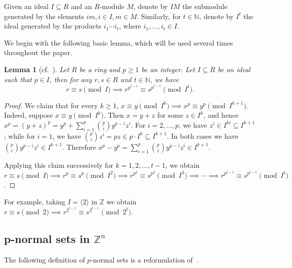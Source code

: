 \documentclass[letterpaper, 11pt, thm-restate]{article}
\numberwithin{equation}{section}
\newcommand{\Z}{\mathbb{Z}}
\newcommand{\N}{\mathbb{N}}
\newcommand{\gen}[1]{\langle {#1} \rangle}
\newtheorem{lemma}[theorem]{Lemma}
\theoremstyle{definition}
\theoremstyle{definition}
\theoremstyle{definition}
\begin{document}
\medskip
Given an ideal $I \subseteq R$ and an $R$-module $M$, denote by $IM$ the submodule generated by the elements $im, i \in I, m \in M$.
Similarly, for $t \in \N$, denote by $I^t$ the ideal generated by the products $i_1 \cdots i_t$, where $i_1, \ldots, i_t \in I$.

We begin with the following basic lemma, which will be used several times throughout the paper.
\begin{lemma}[{cf.~\cite[Lemma~3.13]{dong2025s}}]\label{lem:lifting}
    Let $R$ be a ring and $p \geq 1$ be an integer.
    Let $I \subseteq R$ be an ideal such that $p \in I$, then for any $r, s \in R$ and $t \in \N$, we have
    \[
    r \equiv s \pmod{I} \implies r^{p^{t-1}} \equiv s^{p^{t-1}} \pmod{I^t}.
    \]
\end{lemma}
\begin{proof}
    We claim that for every $k \geq 1$, $x \equiv y \pmod{I^k} \implies x^p \equiv y^p \pmod{I^{k+1}}$.
    Indeed, suppose $x \equiv y \pmod{I^k}$.
    Then $x = y + z$ for some $z \in I^k$, and hence $x^p = (y + z)^p = y^p + \sum_{i = 1}^p \binom{p}{i} y^{p-i} z^i$. 
    For $i = 2, \ldots, p$, we have $z^i \in I^{ki} \subseteq I^{k+1}$; while for $i = 1$, we have $\binom{p}{i} z^i = pz \in p \cdot I^k \subseteq I^{k+1}$.
    In both cases we have $\binom{p}{i} y^{p-i} z^i \in I^{k+1}$.
    Therefore $x^p - y^p = \sum_{i = 1}^p \binom{p}{i} y^{p-i} z^i \in I^{k+1}$.

    Applying this claim successively for $k = 1, 2, \ldots, t-1$, we obtain
    $
    r \equiv s \pmod{I} \implies r^p \equiv s^p \pmod{I^2} \implies r^{p^2} \equiv s^{p^2} \pmod{I^3} \implies \cdots \implies r^{p^{t-1}} \equiv s^{p^{t-1}} \pmod{I^{t}}
    $.
\end{proof}

For example, taking $I = \gen{2}$ in $\Z$ we obtain $r \equiv s \pmod{2} \implies r^{2^{t-1}} \equiv s^{2^{t-1}} \pmod{2^t}$.

\subsection{p-normal sets in $\Z^n$}

The following definition of $p$-normal sets is a reformulation of~\cite{derksen2012linear}.
\end{document}
